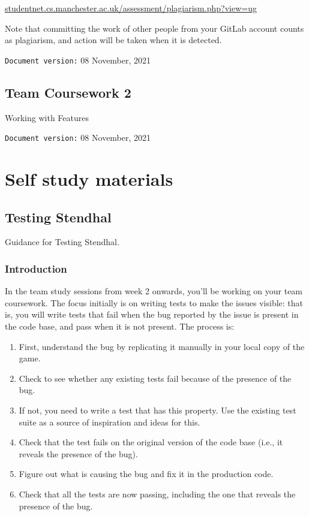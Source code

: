 \documentclass[
]{book}
\providecommand{\tightlist}{%
  \setlength{\itemsep}{0pt}\setlength{\parskip}{0pt}}
\begin{document}
\href{http://studentnet.cs.manchester.ac.uk/assessment/plagiarism.php?view=ug}{studentnet.cs.manchester.ac.uk/assessment/plagiarism.php?view=ug}

Note that committing the work of other people from your GitLab account counts as plagiarism, and action will be taken when it is detected.

\texttt{Document\ version:} 08 November, 2021

\hypertarget{working}{%
\chapter{Team Coursework 2}\label{working}}

Working with Features

\texttt{Document\ version:} 08 November, 2021

\hypertarget{part-self-study-materials}{%
\part{Self study materials}\label{part-self-study-materials}}

\hypertarget{guiding}{%
\chapter{Testing Stendhal}\label{guiding}}

Guidance for Testing Stendhal.

\hypertarget{intros}{%
\section{Introduction}\label{intros}}

In the team study sessions from week 2 onwards, you'll be working on your team coursework. The focus initially is on writing tests to make the issues visible: that is, you will write tests that fail when the bug reported by the issue is present in the code base, and pass when it is not present. The process is:

\begin{enumerate}
\def\labelenumi{\arabic{enumi}.}
\tightlist
\item
  First, understand the bug by replicating it manually in your local copy of the game.
\item
  Check to see whether any existing tests fail because of the presence of the bug.
\item
  If not, you need to write a test that has this property. Use the existing test suite as a source of inspiration and ideas for this.
\item
  Check that the test fails on the original version of the code base (i.e., it reveals the presence of the bug).
\item
  Figure out what is causing the bug and fix it in the production code.
\item
  Check that all the tests are now passing, including the one that reveals the presence of the bug.
\end{enumerate}
\end{document}
